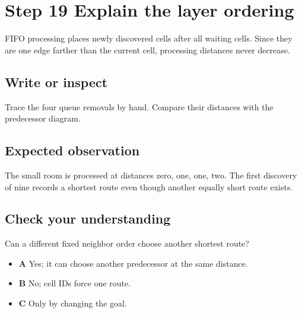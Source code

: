 \section{Step 19 Explain the layer ordering}\label{maze-s19}

FIFO processing places newly discovered cells after all waiting cells. Since they are one edge farther than the current cell, processing distances never decrease.

\subsection{Write or inspect}

Trace the four queue removals by hand. Compare their distances with the predecessor diagram.

\subsection{Expected observation}

The small room is processed at distances zero, one, one, two. The first discovery of nine records a shortest route even though another equally short route exists.

\subsection{Check your understanding}

Can a different fixed neighbor order choose another shortest route?

\begin{itemize}
  \item \textbf{A} Yes; it can choose another predecessor at the same distance.
  \item \textbf{B} No; cell IDs force one route.
  \item \textbf{C} Only by changing the goal.
\end{itemize}
